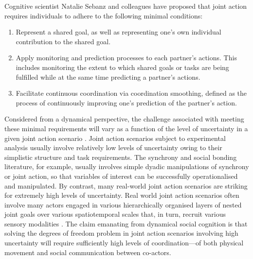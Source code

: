 \begin{CJK}{UTF8}{gbsn}
Cognitive scientist Natalie Sebanz and colleagues \citep{Sebanz2006,Vesper2010} have proposed that joint action requires individuals to adhere to the following minimal conditions:

\begin{enumerate}
  \item Represent a shared goal, as well as representing one's own individual contribution to the shared goal.
  \item Apply monitoring and prediction processes to each partner's actions. This includes monitoring the extent to which shared goals or tasks are being fulfilled while at the same time predicting a partner's actions.
  \item Facilitate continuous coordination via coordination smoothing, defined as the process of continuously improving one's prediction of the partner's action.
\end{enumerate}

Considered from a dynamical perspective, the challenge associated with meeting these minimal requirements will vary as a function of the level of uncertainty in a given joint action scenario \citep{Turvey1982}.  Joint action scenarios subject to experimental analysis usually involve relatively low levels of uncertainty owing to their simplistic structure and task requirements.  The synchrony and social bonding literature, for example, usually involves simple dyadic manipulations of synchrony or joint action, so that variables of interest can be successfully operationalised and manipulated.  By contrast, many real-world joint action scenarios are striking for extremely high levels of uncertainty.  Real world joint action scenarios often involve many actors engaged in various hierarchically organised layers of nested joint goals over various spatiotemporal scales that, in turn, recruit various sensory modalities \citep{Keller2014}.  The claim emanating from dynamical social cognition is that solving the degrees of freedom problem in joint action scenarios involving high uncertainty will require sufficiently high levels of coordination---of both physical movement and social communication between co-actors.



\end{CJK}
